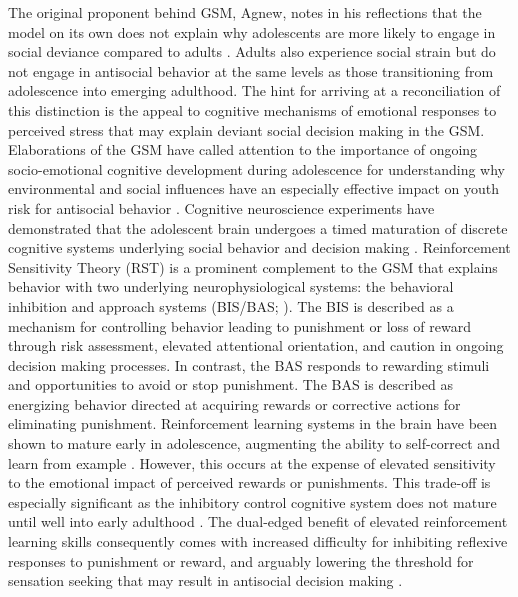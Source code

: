 \documentclass[utf8]{article}
\begin{document}
The original proponent behind GSM, Agnew, notes in his reflections that the model on its own does not explain why adolescents are more likely to engage in social deviance compared to adults \citep{froggio2007strain,agnew2012reflection}. Adults also experience social strain but do not engage in antisocial behavior at the same levels as those transitioning from adolescence into emerging adulthood. The hint for arriving at a reconciliation of this distinction is the appeal to cognitive mechanisms of emotional responses to perceived stress that may explain deviant social decision making in the GSM. Elaborations of the GSM have called attention to the importance of ongoing socio-emotional cognitive development during adolescence for understanding why environmental and social influences have an especially effective impact on youth risk for antisocial behavior \citep{hasking2007reinforcement}. Cognitive neuroscience experiments have demonstrated that the adolescent brain undergoes a timed maturation of discrete cognitive systems underlying social behavior and decision making \citep{CaseyEtAl2008}. Reinforcement Sensitivity Theory (RST) is a prominent complement to the GSM that explains behavior with two underlying neurophysiological systems: the behavioral inhibition and approach systems (BIS/BAS; \cite{carver1994behavioral,gray1970psychophysiological}). The BIS is described as a mechanism for controlling behavior leading to punishment or loss of reward through risk assessment, elevated attentional orientation, and caution in ongoing decision making processes. In contrast, the BAS responds to rewarding stimuli and opportunities to avoid or stop punishment. The BAS is described as energizing behavior directed at acquiring rewards or corrective actions for eliminating punishment. Reinforcement learning systems in the brain have been shown to mature early in adolescence, augmenting the ability to self-correct and learn from example \citep{somerville2010time}. However, this occurs at the expense of elevated sensitivity to the emotional impact of perceived rewards or punishments. This trade-off is especially significant as the inhibitory control cognitive system does not mature until well into early adulthood \citep{somerville2010developmental}. The dual-edged benefit of elevated reinforcement learning skills consequently comes with increased difficulty for inhibiting reflexive responses to punishment or reward, and arguably lowering the threshold for sensation seeking that may result in antisocial decision making \citep{LunaWright2016}. 
\end{document}
